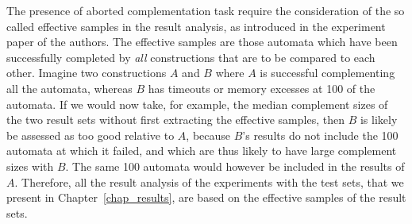 The presence of aborted complementation task require the consideration of the so called effective samples in the result analysis, as introduced in the experiment paper of the \goal{} authors. The effective samples are those automata which have been successfully completed by \textit{all} constructions that are to be compared to each other. Imagine two constructions $A$ and $B$ where $A$ is successful complementing all the automata, whereas $B$ has timeouts or memory excesses at 100 of the automata. If we would now take, for example, the median complement sizes of the two result sets without first extracting the effective samples, then $B$ is likely be assessed as too good relative to $A$, because $B$'s results do not include the 100 automata at which it failed, and which are thus likely to have large complement sizes with $B$. The same 100 automata would however be included in the results of $A$. Therefore, all the result analysis of the experiments with the \goal{} test sets, that we present in Chapter~\ref{chap_results}, are based on the effective samples of the result sets. 




